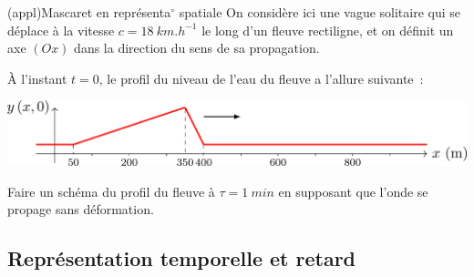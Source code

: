 \documentclass[../../main/main.tex]{subfiles}
\begin{document}
\begin{tcb*}(appl){Mascaret en représenta$^\circ$ spatiale}
	On considère ici une vague solitaire qui se déplace à la vitesse $\boxed{c =
			\SI{18}{km.h^{-1}}}$ le long d'un fleuve rectiligne, et on définit un axe
	$(Ox)$ dans la direction du sens de sa propagation.

	À l'instant $t=0$, le profil du niveau de l'eau du fleuve a l'allure
	suivante~:
	\begin{center}
		\includegraphics[width=0.8\linewidth]{rep_spa-masc_a}
	\end{center}
	Faire un schéma du profil du fleuve à $\tau = \SI{1}{min}$ en supposant que
	l'onde se propage sans déformation.
	\tcblower
	\begin{center}
	\end{center}
\end{tcb*}

\subsection{Représentation temporelle et retard}
\end{document}
